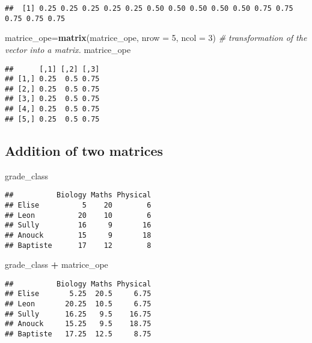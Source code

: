 \documentclass[
]{article}
\newenvironment{Shaded}{\begin{snugshade}}{\end{snugshade}}
\newcommand{\AttributeTok}[1]{\textcolor[rgb]{0.13,0.29,0.53}{#1}}
\newcommand{\CommentTok}[1]{\textcolor[rgb]{0.56,0.35,0.01}{\textit{#1}}}
\newcommand{\DecValTok}[1]{\textcolor[rgb]{0.00,0.00,0.81}{#1}}
\newcommand{\FunctionTok}[1]{\textcolor[rgb]{0.13,0.29,0.53}{\textbf{#1}}}
\newcommand{\NormalTok}[1]{#1}
\newcommand{\OtherTok}[1]{\textcolor[rgb]{0.56,0.35,0.01}{#1}}
\newcommand{\SpecialCharTok}[1]{\textcolor[rgb]{0.81,0.36,0.00}{\textbf{#1}}}
\begin{document}
\begin{verbatim}
##  [1] 0.25 0.25 0.25 0.25 0.25 0.50 0.50 0.50 0.50 0.50 0.75 0.75 0.75 0.75 0.75
\end{verbatim}

\begin{Shaded}
\begin{Highlighting}[]
\NormalTok{matrice\_ope}\OtherTok{=}\FunctionTok{matrix}\NormalTok{(matrice\_ope, }\AttributeTok{nrow =} \DecValTok{5}\NormalTok{, }\AttributeTok{ncol =} \DecValTok{3}\NormalTok{) }\CommentTok{\# transformation of the vector into a matrix.}
\NormalTok{matrice\_ope}
\end{Highlighting}
\end{Shaded}

\begin{verbatim}
##      [,1] [,2] [,3]
## [1,] 0.25  0.5 0.75
## [2,] 0.25  0.5 0.75
## [3,] 0.25  0.5 0.75
## [4,] 0.25  0.5 0.75
## [5,] 0.25  0.5 0.75
\end{verbatim}

\hypertarget{addition-of-two-matrices}{%
\subsection{Addition of two matrices}\label{addition-of-two-matrices}}

\begin{Shaded}
\begin{Highlighting}[]
\NormalTok{grade\_class}
\end{Highlighting}
\end{Shaded}

\begin{verbatim}
##          Biology Maths Physical
## Elise          5    20        6
## Leon          20    10        6
## Sully         16     9       16
## Anouck        15     9       18
## Baptiste      17    12        8
\end{verbatim}

\begin{Shaded}
\begin{Highlighting}[]
\NormalTok{grade\_class }\SpecialCharTok{+}\NormalTok{ matrice\_ope}
\end{Highlighting}
\end{Shaded}

\begin{verbatim}
##          Biology Maths Physical
## Elise       5.25  20.5     6.75
## Leon       20.25  10.5     6.75
## Sully      16.25   9.5    16.75
## Anouck     15.25   9.5    18.75
## Baptiste   17.25  12.5     8.75
\end{verbatim}
\end{document}
